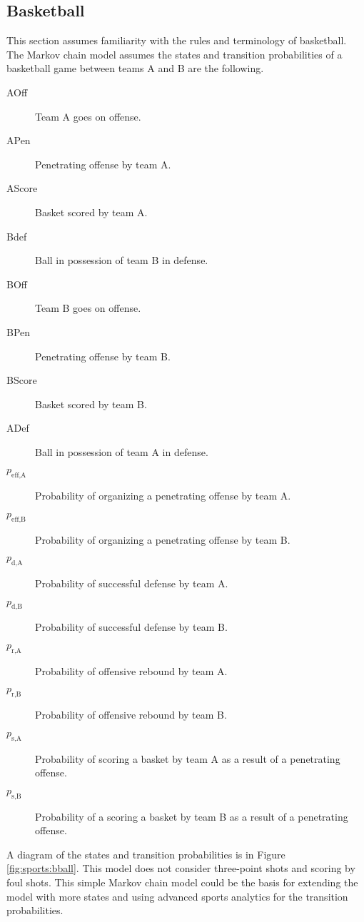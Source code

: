 \documentclass[12pt]{article}
\begin{document}
\subsection*{Basketball}

This section assumes familiarity with the rules and terminology of
basketball.%
The Markov chain model assumes the states and transition probabilities
of a basketball game between teams A and B are the following.
\begin{description}
    \item[AOff]
        Team A goes on offense.
    \item[APen]
        Penetrating offense by team A.
    \item[AScore]
        Basket scored by team A.
    \item[Bdef]
        Ball in possession of team B in defense.
    \item[BOff]
        Team B goes on offense.
    \item[BPen]
        Penetrating offense by team B.
    \item[BScore]
        Basket scored by team B.
    \item[ADef]
        Ball in possession of team A in defense.
    \item[$p_{\text{eff,A}}$]
        Probability of organizing a penetrating offense by team A.
    \item[$p_{\text{eff,B}}$]
        Probability of organizing a penetrating offense by team B.
    \item[$p_{\text{d,A}}$]
        Probability of successful defense by team A.
    \item[$p_{\text{d,B}}$]
        Probability of successful defense by team B.
    \item[$p_{\text{r,A}}$]
        Probability of offensive rebound by team A.
    \item[$p_{\text{r,B}}$]
        Probability of offensive rebound by team B.
    \item[$p_{\text{s,A}}$]
        Probability of scoring a basket by team A as a result of a
        penetrating offense.
    \item[$p_{\text{s,B}}$]
        Probability of a scoring a basket by team B as a result of a
        penetrating offense.
\end{description}
A diagram of the states and transition probabilities is in Figure~%
\ref{fig:sports:bball}.  This model does not consider three-point shots
and scoring by foul shots.  This simple Markov chain model could be the
basis for extending the model with more states and using advanced sports
analytics for the transition probabilities.
\end{document}
